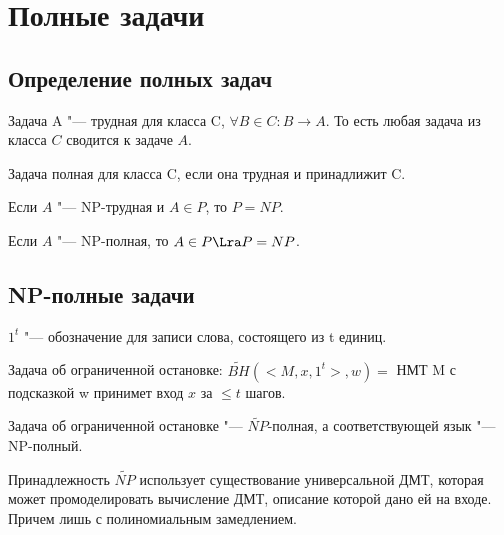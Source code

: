 \section{Полные задачи}	
\subsection{Определение полных задач}
\begin{Def}
	Задача A "--- трудная для класса C, $\forall B \in C \colon B \to A$.
	То есть любая задача из класса $C$ сводится к задаче $A$. 
\end{Def}

\begin{Def}
	Задача полная для класса C, если она трудная и принадлижит C.
\end{Def}

\begin{theorem}
	Если $A$ "--- NP-трудная и $A \in P$,
	то $P = NP$.
\end{theorem}
\begin{conseq}
	Если $A$ "--- NP-полная, то $A \in P \Lra P = NP$.
\end{conseq}

\subsection{NP-полные задачи}
\begin{Def}
	$1^t$ "--- обозначение для записи слова, состоящего из t единиц.
\end{Def}
\begin{Def}
	Задача об ограниченной остановке: 
	$\tilde{BH}(<M, x, 1^t>, w) =$ НМТ
	M с подсказкой w принимет вход $x$ за $\le t$ шагов.
\end{Def}
\begin{theorem}
	Задача об ограниченной остановке "--- $\tilde{NP}$-полная, 
	а соответствующей язык "--- NP-полный. 
\end{theorem}
\begin{Rem}
	Принадлежность $\tilde{NP}$ использует существование универсальной ДМТ, которая 
	может промоделировать вычисление ДМТ, описание которой дано ей на входе. Причем лишь с полиномиальным замедлением. 
\end{Rem}

